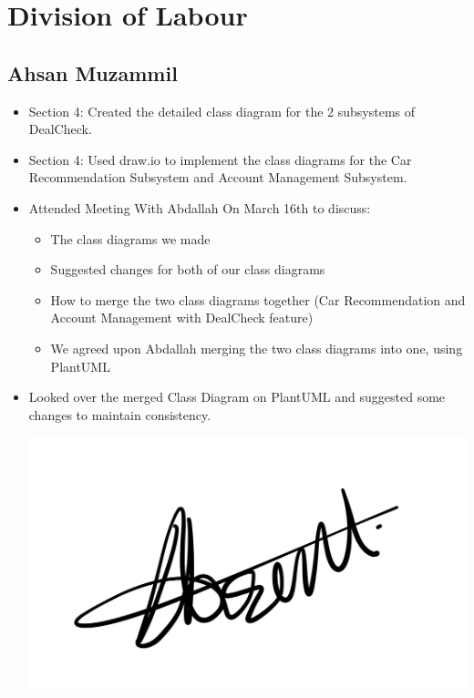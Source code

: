 \documentclass[]{article}
\begin{document}

\appendix
\section{Division of Labour}
\label{sec:division_of_labour}
\subsection{Ahsan Muzammil}
\begin{itemize}
  \item Section 4: Created the detailed class diagram for the 2 subsystems of DealCheck.
  \item Section 4: Used draw.io to implement the class diagrams for the Car Recommendation Subsystem and Account Management Subsystem.
  \item Attended Meeting With Abdallah On March 16th to discuss:
        \begin{itemize}
          \item The class diagrams we made
          \item Suggested changes for both of our class diagrams
          \item How to merge the two class diagrams together (Car Recommendation and Account Management with DealCheck feature)
          \item We agreed upon Abdallah merging the two class diagrams into one, using PlantUML
        \end{itemize}
  \item Looked over the merged Class Diagram on PlantUML and suggested some changes to maintain consistency.
        \begin{center}
          \includegraphics[scale=0.1]{ahsan.jpeg}
        \end{center}
\end{itemize}
\end{document}
